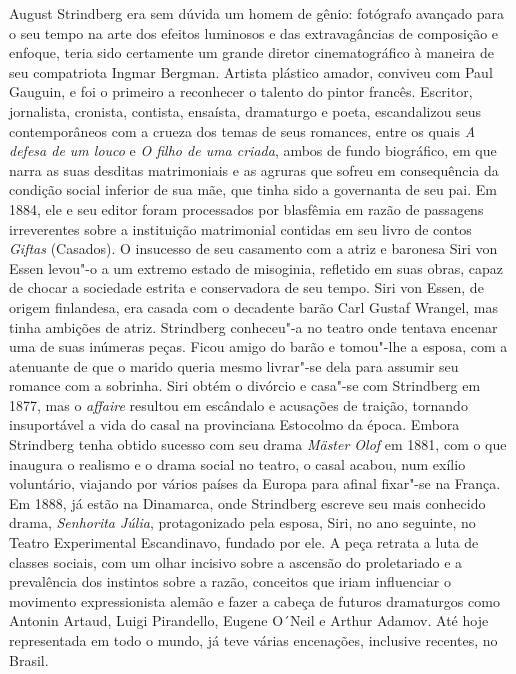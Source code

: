 August Strindberg era sem dúvida um homem de gênio: fotógrafo avançado
para o seu tempo na arte dos efeitos luminosos e das extravagâncias de
composição e enfoque, teria sido certamente um grande diretor
cinematográfico à maneira de seu compatriota Ingmar Bergman. Artista
plástico amador, conviveu com Paul Gauguin, e foi o primeiro a
reconhecer o talento do pintor francês. Escritor, jornalista, cronista,
contista, ensaísta, dramaturgo e poeta, escandalizou seus
contemporâneos com a crueza dos temas de seus romances, entre os quais
\textit{A defesa de um louco} e \textit{O filho de uma criada}, ambos
de fundo biográfico, em que narra as suas desditas matrimoniais e as
agruras que sofreu em consequência da condição social inferior de sua
mãe, que tinha sido a governanta de seu pai. Em 1884, ele e seu editor
foram processados por blasfêmia em razão de passagens irreverentes
sobre a instituição matrimonial contidas em seu livro de contos \textit{Giftas}
(Casados). O insucesso de seu casamento com a atriz e baronesa Siri von
Essen levou"-o a um extremo estado de misoginia, refletido em suas
obras, capaz de chocar a sociedade estrita e conservadora de seu tempo.
Siri von Essen, de origem finlandesa, era casada com o decadente barão
Carl Gustaf Wrangel, mas tinha ambições de atriz. Strindberg
conheceu"-a no teatro onde tentava encenar uma de suas inúmeras peças.
Ficou amigo do barão e tomou"-lhe a esposa, com a atenuante de que o
marido queria mesmo livrar"-se dela para assumir seu romance com a
sobrinha. Siri obtém o divórcio e casa"-se com Strindberg em 1877, mas
o \textit{affaire} resultou em escândalo e acusações de traição,
tornando insuportável a vida do casal na provinciana Estocolmo da
época. Embora Strindberg tenha obtido sucesso com seu drama
\textit{Mäster Olof} em 1881, com o que inaugura o realismo e o drama
social no teatro, o casal acabou, num exílio voluntário, viajando por
vários países da Europa para afinal fixar"-se na França. Em 1888, já
estão na Dinamarca, onde Strindberg escreve seu mais conhecido drama,
\textit{Senhorita Júlia}, protagonizado pela esposa, Siri, no ano
seguinte, no Teatro Experimental Escandinavo, fundado por ele. A peça
retrata a luta de classes sociais, com um olhar incisivo sobre a
ascensão do proletariado e a prevalência dos instintos sobre a razão,
conceitos que iriam influenciar o movimento expressionista alemão e
fazer a cabeça de futuros dramaturgos como Antonin Artaud, Luigi
Pirandello, Eugene O´Neil e Arthur Adamov. Até hoje representada em
todo o mundo, já teve várias encenações, inclusive recentes, no Brasil.

